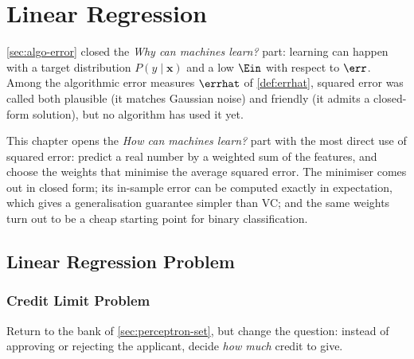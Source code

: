 \chapter{Linear Regression}

\begin{prev}
    \autoref{sec:algo-error} closed the \emph{Why can machines learn?} part:
    learning can happen with a target distribution \(P(y \mid \bm{x})\) and a
    low \(\Ein\) with respect to \(\err\). Among the algorithmic error measures
    \(\errhat\) of \autoref{def:errhat}, squared error was called both
    plausible (it matches Gaussian noise) and friendly (it admits a closed-form
    solution), but no algorithm has used it yet.
\end{prev}

This chapter opens the \emph{How can machines learn?} part with the most
direct use of squared error: predict a real number by a weighted sum of the
features, and choose the weights that minimise the average squared error. The
minimiser comes out in closed form; its in-sample error can be computed exactly
in expectation, which gives a generalisation guarantee simpler than VC; and the
same weights turn out to be a cheap starting point for binary classification.

\section{Linear Regression Problem}\label{sec:linreg-problem}


\subsection{Credit Limit Problem}

Return to the bank of \autoref{sec:perceptron-set}, but change the question:
instead of approving or rejecting the applicant, decide \emph{how much} credit
to give.

